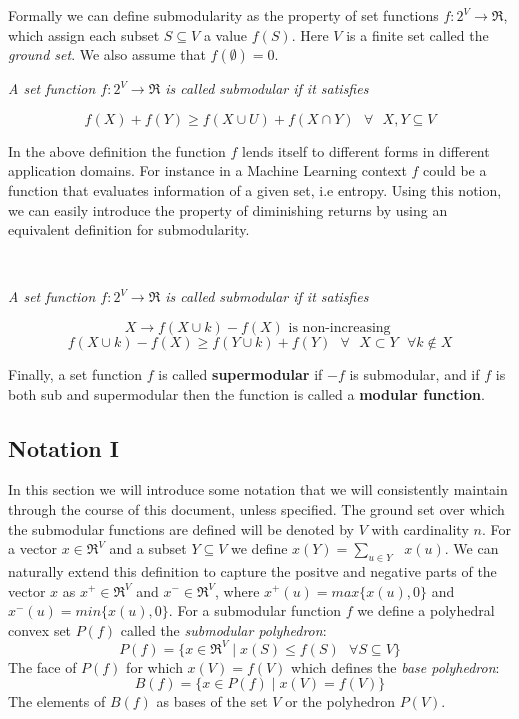 Formally we can define submodularity as the property of set functions $f:2^V \rightarrow \Re$, which assign each subset $S \subseteq V$ a value $f(S)$. Here $V$ is a finite set called the {\it ground set}. We also assume that $f(\emptyset) = 0$.\\

 {\bf {}} {\it A set function $f:2^V \rightarrow \Re$ is called submodular if it satisfies

\[
 f(X) + f(Y) \geq f(X \cup U) + f(X \cap Y) \text{  } \forall \text{  } X,Y \subseteq V
\]

In the above definition the function $f$ lends itself to different forms in different application domains. For instance in a Machine Learning context $f$ could be a function that evaluates information of a given set, i.e entropy. Using this notion, we can easily introduce the property of diminishing returns by using an equivalent definition for submodularity.}\\

{\bf {}} {\it A set function $f:2^V \rightarrow \Re$ is called submodular if it satisfies

\[
 X \rightarrow f(X\cup {k}) - f(X) \text{ is non-increasing }
 \]
 \[
 f(X \cup {k}) - f(X) \geq f(Y \cup {k}) + f(Y) \text{  } \forall \text{  } X\subset Y \text{  } \forall k \notin X
\]

Finally, a set function $f$ is called {\bf supermodular} if $-f$ is submodular, and if $f$ is both sub and supermodular then the function is called a {\bf modular function}.}

\subsection{Notation I}
\label{sec:notation}
In this section we will introduce some notation that we will consistently maintain through the course of this document, unless specified. The ground set over which the submodular functions are defined will be denoted by $V$ with cardinality $n$. For a vector $x \in \Re^V$ and a subset $Y \subseteq V$ we define $x(Y) = \underset{u \in Y}{\operatorname{\sum }}\text{ } x(u)$. We can naturally extend this definition to capture the positve and negative parts of the vector $x$ as $x^+\in \Re^V$ and $x^-\in \Re^V$, where $x^+(u) = max\{x(u),0\}$ and $x^-(u) = min\{x(u),0\}$. For a submodular function $f$ we define a polyhedral convex set $P(f)$ called the {\it submodular polyhedron}:
\[
 P(f) = \{ x\in \Re^V \mid x(S) \leq f(S) \text{ }\forall S\subseteq V \}
\]
The face of $P(f)$ for which $x(V) = f(V)$ which defines the {\it base polyhedron}:
\[
 B(f) = \{ x \in P(f) \mid x(V) = f(V)\}
\]
The elements of $B(f)$ as bases of the set $V$ or the polyhedron $P(V)$.


